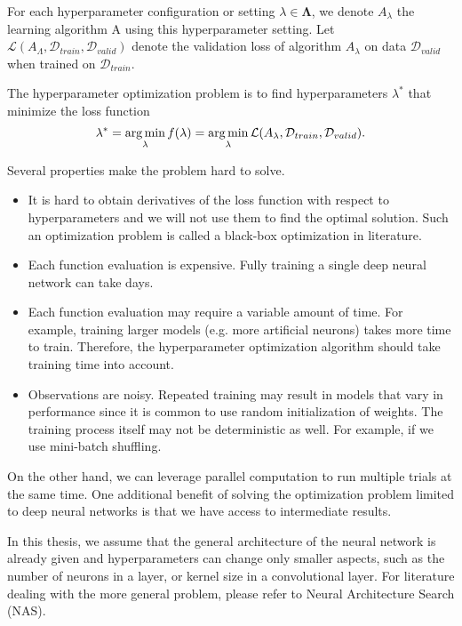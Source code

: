 For each hyperparameter configuration or setting $\lambda \in \mathbf{\Lambda}$, we denote $A_\lambda$ the learning algorithm A using this hyperparameter setting. Let $\mathcal{L}(A_\Lambda, \mathcal{D}_{train}, \mathcal{D}_{valid})$ denote the validation loss of algorithm $A_\lambda$ on data $\mathcal{D}_{valid}$ when trained on $\mathcal{D}_{train}$.

\begin{defn}\label{defn:x}
The hyperparameter optimization problem is to find hyperparameters $\lambda^*$ that minimize the loss function  \[\lambda^*=\operatorname*{arg\,min} _\lambda f(\lambda)=\operatorname*{arg\,min}_\lambda \mathcal{L}(A_\lambda, \mathcal{D}_{train}, \mathcal{D}_{valid}).\]
\end{defn}

Several properties make the problem hard to solve.
\begin{itemize}
    \item It is hard to obtain derivatives of the loss function with respect to hyperparameters and we will not use them to find the optimal solution. Such an optimization problem is called a black-box optimization in literature.
    \item Each function evaluation is expensive. Fully training a single deep neural network can take days.
    \item Each function evaluation may require a variable amount of time. For example, training larger models (e.g. more artificial neurons) takes more time to train. Therefore, the hyperparameter optimization algorithm should take training time into account.
    \item Observations are noisy. Repeated training may result in models that vary in performance since it is common to use random initialization of weights. The training process itself may not be deterministic as well. For example, if we use mini-batch shuffling.
\end{itemize}

On the other hand, we can leverage parallel computation to run multiple trials at the same time. One additional benefit of solving the optimization problem limited to deep neural networks is that we have access to intermediate results.


In this thesis, we assume that the general architecture of the neural network is already given and hyperparameters can change only smaller aspects, such as the number of neurons in a layer, or kernel size in a convolutional layer. For literature dealing with the more general problem, please refer to Neural Architecture Search (NAS).

